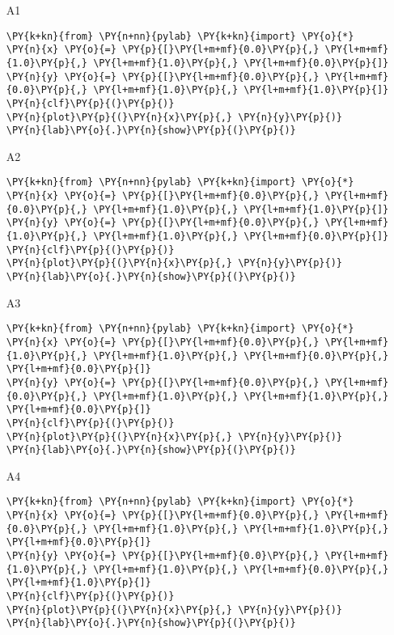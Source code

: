 \begin{enumerate}
\begin{enumerate}
\item[A1] 
\begin{Verbatim}[commandchars=\\\{\}]
\PY{k+kn}{from} \PY{n+nn}{pylab} \PY{k+kn}{import} \PY{o}{*}
\PY{n}{x} \PY{o}{=} \PY{p}{[}\PY{l+m+mf}{0.0}\PY{p}{,} \PY{l+m+mf}{1.0}\PY{p}{,} \PY{l+m+mf}{1.0}\PY{p}{,} \PY{l+m+mf}{0.0}\PY{p}{]}
\PY{n}{y} \PY{o}{=} \PY{p}{[}\PY{l+m+mf}{0.0}\PY{p}{,} \PY{l+m+mf}{0.0}\PY{p}{,} \PY{l+m+mf}{1.0}\PY{p}{,} \PY{l+m+mf}{1.0}\PY{p}{]}
\PY{n}{clf}\PY{p}{(}\PY{p}{)}
\PY{n}{plot}\PY{p}{(}\PY{n}{x}\PY{p}{,} \PY{n}{y}\PY{p}{)}
\PY{n}{lab}\PY{o}{.}\PY{n}{show}\PY{p}{(}\PY{p}{)}
\end{Verbatim}
\item[A2] 
\begin{Verbatim}[commandchars=\\\{\}]
\PY{k+kn}{from} \PY{n+nn}{pylab} \PY{k+kn}{import} \PY{o}{*}
\PY{n}{x} \PY{o}{=} \PY{p}{[}\PY{l+m+mf}{0.0}\PY{p}{,} \PY{l+m+mf}{0.0}\PY{p}{,} \PY{l+m+mf}{1.0}\PY{p}{,} \PY{l+m+mf}{1.0}\PY{p}{]}
\PY{n}{y} \PY{o}{=} \PY{p}{[}\PY{l+m+mf}{0.0}\PY{p}{,} \PY{l+m+mf}{1.0}\PY{p}{,} \PY{l+m+mf}{1.0}\PY{p}{,} \PY{l+m+mf}{0.0}\PY{p}{]}
\PY{n}{clf}\PY{p}{(}\PY{p}{)}
\PY{n}{plot}\PY{p}{(}\PY{n}{x}\PY{p}{,} \PY{n}{y}\PY{p}{)}
\PY{n}{lab}\PY{o}{.}\PY{n}{show}\PY{p}{(}\PY{p}{)}
\end{Verbatim}
\item[A3] 
\begin{Verbatim}[commandchars=\\\{\}]
\PY{k+kn}{from} \PY{n+nn}{pylab} \PY{k+kn}{import} \PY{o}{*}
\PY{n}{x} \PY{o}{=} \PY{p}{[}\PY{l+m+mf}{0.0}\PY{p}{,} \PY{l+m+mf}{1.0}\PY{p}{,} \PY{l+m+mf}{1.0}\PY{p}{,} \PY{l+m+mf}{0.0}\PY{p}{,} \PY{l+m+mf}{0.0}\PY{p}{]}
\PY{n}{y} \PY{o}{=} \PY{p}{[}\PY{l+m+mf}{0.0}\PY{p}{,} \PY{l+m+mf}{0.0}\PY{p}{,} \PY{l+m+mf}{1.0}\PY{p}{,} \PY{l+m+mf}{1.0}\PY{p}{,} \PY{l+m+mf}{0.0}\PY{p}{]}
\PY{n}{clf}\PY{p}{(}\PY{p}{)}
\PY{n}{plot}\PY{p}{(}\PY{n}{x}\PY{p}{,} \PY{n}{y}\PY{p}{)}
\PY{n}{lab}\PY{o}{.}\PY{n}{show}\PY{p}{(}\PY{p}{)}
\end{Verbatim}
\item[A4] 
\begin{Verbatim}[commandchars=\\\{\}]
\PY{k+kn}{from} \PY{n+nn}{pylab} \PY{k+kn}{import} \PY{o}{*}
\PY{n}{x} \PY{o}{=} \PY{p}{[}\PY{l+m+mf}{0.0}\PY{p}{,} \PY{l+m+mf}{0.0}\PY{p}{,} \PY{l+m+mf}{1.0}\PY{p}{,} \PY{l+m+mf}{1.0}\PY{p}{,} \PY{l+m+mf}{0.0}\PY{p}{]}
\PY{n}{y} \PY{o}{=} \PY{p}{[}\PY{l+m+mf}{0.0}\PY{p}{,} \PY{l+m+mf}{1.0}\PY{p}{,} \PY{l+m+mf}{1.0}\PY{p}{,} \PY{l+m+mf}{0.0}\PY{p}{,} \PY{l+m+mf}{1.0}\PY{p}{]}
\PY{n}{clf}\PY{p}{(}\PY{p}{)}
\PY{n}{plot}\PY{p}{(}\PY{n}{x}\PY{p}{,} \PY{n}{y}\PY{p}{)}
\PY{n}{lab}\PY{o}{.}\PY{n}{show}\PY{p}{(}\PY{p}{)}
\end{Verbatim}
\end{enumerate}


\end{enumerate}
